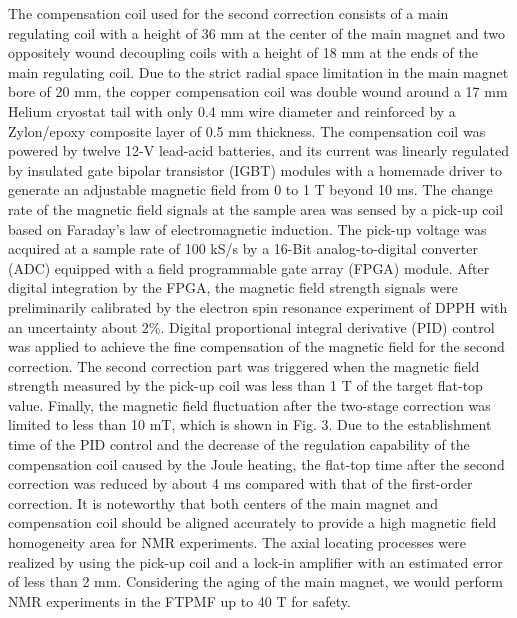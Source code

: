 \documentclass[lettersize,journal]{IEEEtran}
\begin{document}
The compensation coil used for the second correction consists of a main regulating coil with a height of 36 mm at the center of the main magnet and two oppositely wound decoupling coils with a height of 18 mm at the ends of the main regulating coil. Due to the strict radial space limitation in the main magnet bore of 20 mm, the copper compensation coil was double wound around a 17 mm Helium cryostat tail with only 0.4 mm wire diameter and reinforced by a Zylon/epoxy composite layer of 0.5 mm thickness. The compensation coil was powered by twelve 12-V lead-acid batteries, and its current was linearly regulated by insulated gate bipolar transistor (IGBT) modules with a homemade driver to generate an adjustable magnetic field from 0 to 1 T beyond 10 ms. The change rate of the magnetic field signals at the sample area was sensed by a pick-up coil based on Faraday's law of electromagnetic induction. The pick-up voltage was acquired at a sample rate of 100 kS/s by a 16-Bit analog-to-digital converter (ADC) equipped with a field programmable gate array (FPGA) module. After digital integration by the FPGA, the magnetic field strength signals were preliminarily calibrated by the electron spin resonance experiment of DPPH with an uncertainty about 2{\%}. Digital proportional integral derivative (PID) control was applied to achieve the fine compensation of the magnetic field for the second correction. The second correction part was triggered when the magnetic field strength measured by the pick-up coil was less than 1 T of the target flat-top value. Finally, the magnetic field fluctuation after the two-stage correction was limited to less than 10 mT, which is shown in Fig. 3. Due to the establishment time of the PID control and the decrease of the regulation capability of the compensation coil caused by the Joule heating, the flat-top time after the second correction was reduced by about 4 ms compared with that of the first-order correction. It is noteworthy that both centers of the main magnet and compensation coil should be aligned accurately to provide a high magnetic field homogeneity area for NMR experiments. The axial locating processes were realized by using the pick-up coil and a lock-in amplifier with an estimated error of less than 2 mm. Considering the aging of the main magnet, we would perform NMR experiments in the FTPMF up to 40 T for safety.
\end{document}
